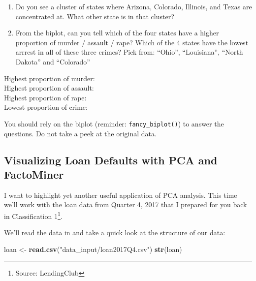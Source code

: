 \documentclass[]{article}
\newenvironment{Shaded}{\begin{snugshade}}{\end{snugshade}}
\newcommand{\KeywordTok}[1]{\textcolor[rgb]{0.13,0.29,0.53}{\textbf{#1}}}
\newcommand{\NormalTok}[1]{#1}
\newcommand{\StringTok}[1]{\textcolor[rgb]{0.31,0.60,0.02}{#1}}
\let\rmarkdownfootnote\footnote%
\def\footnote{\protect\rmarkdownfootnote}
\begin{document}
\begin{enumerate}
\def\labelenumi{\arabic{enumi}.}
\item
  Do you see a cluster of states where Arizona, Colorado, Illinois, and
  Texas are concentrated at. What other state is in that cluster?
\item
  From the biplot, can you tell which of the four states have a higher
  proportion of murder / assault / rape? Which of the 4 states have the
  lowest arrrest in all of these three crimes? Pick from: ``Ohio'',
  ``Louisiana'', ``North Dakota'' and ``Colorado''
\end{enumerate}

Highest proportion of murder:\\
Highest proportion of assault:\\
Highest proportion of rape:\\
Lowest proportion of crime:

You should rely on the biplot (reminder: \texttt{fancy\_biplot()}) to
answer the questions. Do not take a peek at the original data.

\hypertarget{visualizing-loan-defaults-with-pca-and-factominer}{%
\subsection{Visualizing Loan Defaults with PCA and
FactoMiner}\label{visualizing-loan-defaults-with-pca-and-factominer}}

I want to highlight yet another useful application of PCA analysis. This
time we'll work with the loan data from Quarter 4, 2017 that I prepared
for you back in Classification 1\footnote{Source: LendingClub}.

We'll read the data in and take a quick look at the structure of our
data:

\begin{Shaded}
\begin{Highlighting}[]
\NormalTok{loan <-}\StringTok{ }\KeywordTok{read.csv}\NormalTok{(}\StringTok{"data_input/loan2017Q4.csv"}\NormalTok{)}
\KeywordTok{str}\NormalTok{(loan)}
\end{Highlighting}
\end{Shaded}
\end{document}

